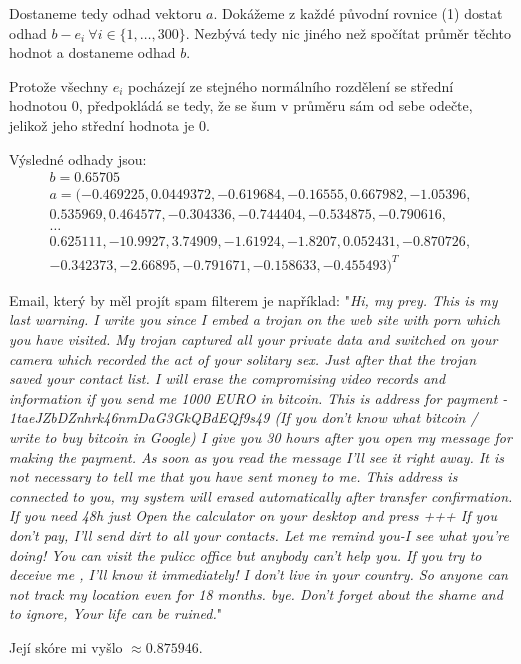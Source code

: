 \documentclass[12pt, a4paper]{article}
\begin{document}
Dostaneme tedy odhad vektoru $a$. Dokážeme z každé původní rovnice (1) dostat odhad $b-e_i \ \forall i \in \{1,\dots, 300\}$. Nezbývá tedy nic jiného než spočítat průměr těchto hodnot a dostaneme odhad $b$.

Protože všechny $e_i$ pocházejí ze stejného normálního rozdělení se střední hodnotou 0, předpokládá se tedy, že se šum v průměru sám od sebe odečte, jelikož jeho střední hodnota je 0.

Výsledné odhady jsou:
\begin{gather*}
b= 0.65705\\
a=(-0.469225, 0.0449372, -0.619684, -0.16555, 0.667982, -1.05396,\\
0.535969, 0.464577, -0.304336, -0.744404, -0.534875, -0.790616,\\
\dots\\
0.625111, -10.9927, 3.74909, -1.61924, -1.8207, 0.052431, -0.870726,\\
-0.342373, -2.66895, -0.791671, -0.158633, -0.455493)^T
\end{gather*}

Email, který by měl projít spam filterem je například:
"\textit{Hi, my prey.
This is my last warning.
I write you since I embed a trojan on the web site with porn which you have visited.
My trojan captured all your private data and switched on your camera which recorded the act of your solitary sex. Just after that the trojan saved your contact list.
I will erase the compromising video records and information if you send me 1000  EURO in bitcoin.
This is address for payment - 1taeJZbDZnhrk46nmDaG3GkQBdEQf9s49
(If you don't know what bitcoin / write to buy bitcoin in Google)
I give you 30 hours after you open my message for making the payment.
As soon as you read the message I'll see it right away.
It is not necessary to tell me that you have sent money to me. This address is connected to you, my system will erased automatically after transfer confirmation.
If you need 48h just Open the calculator on your desktop and press +++
If you don't pay, I'll send dirt to all your contacts.
Let me remind you-I see what you're doing!
You can visit the pulicc office but anybody can't help you.
If you try to deceive me , I'll know it immediately!
I don't live in your country. So anyone can not track my location even for 18 months.
bye. Don't forget about the shame and to ignore, Your life can be ruined.}"

Její skóre mi vyšlo $\approx 0.875946$.
\section{}
\end{document}
